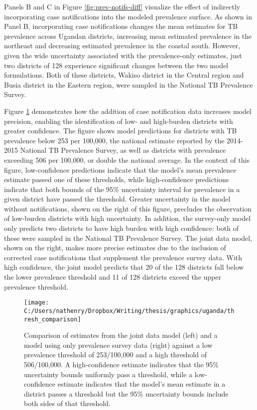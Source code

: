 \documentclass[
]{article}
\begin{document}
Panels B and C in Figure \ref{fig:prev-notifs-diff} visualize the effect of indirectly incorporating case notifications into the modeled prevalence surface. As shown in Panel B, incorporating case notifications changes the mean estimates for TB prevalence across Ugandan districts, increasing mean estimated prevalence in the northeast and decreasing estimated prevalence in the coastal south. However, given the wide uncertainty associated with the prevalence-only estimates, just two districts of 128 experience significant changes between the two model formulations. Both of these districts, Wakiso district in the Central region and Busia district in the Eastern region, were sampled in the National TB Prevalence Survey.

Figure \ref{fig:thresh-comparison} demonstrates how the addition of case notification data increases model precision, enabling the identification of low- and high-burden districts with greater confidence. The figure shows model predictions for districts with TB prevalence below 253 per 100,000, the national estimate reported by the 2014-2015 National TB Prevalence Survey, as well as districts with prevalence exceeding 506 per 100,000, or double the national average. In the context of this figure, low-confidence predictions indicate that the model's mean prevalence estimate passed one of these thresholds, while high-confidence predictions indicate that both bounds of the 95\% uncertainty interval for prevalence in a given district have passed the threshold. Greater uncertainty in the model without notifications, shown on the right of this figure, precludes the observation of low-burden districts with high uncertainty. In addition, the survey-only model only predicts two districts to have high burden with high confidence: both of these were sampled in the National TB Prevalence Survey. The joint data model, shown on the right, makes more precise estimates due to the inclusion of corrected case notifications that supplement the prevalence survey data. With high confidence, the joint model predicts that 20 of the 128 districts fall below the lower prevalence threshold and 11 of 128 districts exceed the upper prevalence threshold.

\begin{figure}[!ht]

{\centering \texttt{[image: C:/Users/nathenry/Dropbox/Writing/thesis/graphics/uganda/thresh\_comparison]} 

}

\caption{Comparison of estimates from the joint data model (left) and a model using only prevalence survey data (right) against a low prevalence threshold of 253/100,000 and a high threshold of 506/100,000. A high-confidence estimate indicates that the 95\% uncertainty bounds uniformly pass a threshold, while a low-confidence estimate indicates that the model's mean estimate in a district passes a threshold but the 95\% uncertainty bounds include both sides of that threshold.}\label{fig:thresh-comparison}
\end{figure}
\end{document}

